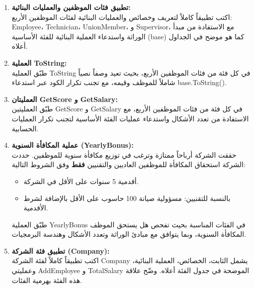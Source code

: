 \documentclass[14pt]{extarticle}
\begin{document}
\begin{enumerate}[label=\textbf{\alph*.} , itemsep=2.5em]

    \item \textbf{تطبيق فئات الموظفين والعمليات البنائية:} \\
    اكتب تطبيقاً كاملاً لتعريف وخصائص والعمليات البنائية لفئات الموظفين الأربع: \newline
    \textenglish{Employee}، \textenglish{Technician}، \textenglish{UnionMember}، و \textenglish{Supervisor}، \newline
    مع الاستفادة من مبدأ الوراثة واستدعاء العملية البنائية للفئة الأساسية (\textenglish{base}) كما هو موضح في الجداول أعلاه.

    \item \textbf{العملية \textenglish{ToString}:} \\
    طبّق العملية \textenglish{ToString} في كل فئة من فئات الموظفين الأربع، بحيث تعيد وصفاً نصياً شاملاً للموظف وقيمه، مع تجنب تكرار الكود عبر استدعاء \textenglish{base.ToString()}.

    \item \textbf{العمليتان \textenglish{GetScore} و \textenglish{GetSalary}:} \\
    طبّق العمليتين \textenglish{GetScore} و \textenglish{GetSalary} في كل فئة من فئات الموظفين الأربع، مع الاستفادة من تعدد الأشكال واستدعاء عمليات الفئة الأساسية لتجنب تكرار العمليات الحسابية.

    \item \textbf{عملية المكافأة السنوية (\textenglish{YearlyBonus}):} \\
    حققت الشركة أرباحاً ممتازة وترغب في توزيع مكافأة سنوية للموظفين. حددت الشركة استحقاق المكافأة للموظفين العاديين والتقنيين \textbf{فقط} وفق الشروط التالية:
    \begin{itemize}
        \item أقدمية 5 سنوات على الأقل في الشركة.
        \item بالنسبة للتقنيين: مسؤولية صيانة 100 حاسوب على الأقل بالإضافة لشرط الأقدمية.
    \end{itemize}
    طبّق العملية \textenglish{YearlyBonus} في الفئات المناسبة بحيث تفحص هل يستحق الموظف المكافأة السنوية، وبما يتوافق مع مبادئ الوراثة وتعدد الأشكال وهندسة البرمجيات.
\clearpage
    \item \textbf{تطبيق فئة الشركة (\textenglish{Company}):} \\
    اكتب تطبيقاً كاملاً لفئة الشركة \textenglish{Company} يشمل الثابت، الخصائص، العملية البنائية، وعمليتي \textenglish{AddEmployee} و \textenglish{TotalSalary} الموضحة في جدول الفئة أعلاه. وضّح علاقة هذه الفئة بهرمية الفئات.


\end{enumerate}
\end{document}
